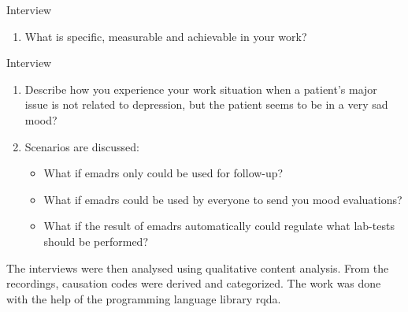 \documentclass[12pt,a4paper,oneside]{article}
\let\oldcite\cite
\renewcommand*\cite[1]{\textsuperscript{\oldcite{#1}}}
\begin{document}
Interview {}\vspace{-.33em}
\begin{enumerate}[label=\sc 1.\arabic*.]
\item {\bf} What is specific, measurable and achievable in your work?
\end{enumerate}
Interview {}\vspace{-.33em}
\begin{enumerate}[label=\sc 2.\arabic*.]
\item {\bf} Describe how you experience your work situation when a patient's major issue is not related to depression, but the patient seems to be in a very sad mood? \vspace{-.33em}
\item {\bf} Scenarios are discussed:\vspace{-.33em}
\begin{itemize}\vspace{-.33em}
\item {\bf} What if e{\sc madrs} only could be used for follow-up?\vspace{-.33em}
\item {\bf} What if e{\sc madrs} could be used by everyone to send you mood evaluations?\vspace{-.33em}
\item {\bf} What if the result of e{\sc madrs} automatically could regulate what lab-tests should be performed?
\end{itemize}
\end{enumerate}
The interviews were then analysed using qualitative content analysis\cite{analysis1}. From the recordings, causation codes were derived and categorized. The work was done with the help of the programming language library {\sc rqda}\cite{rqda}.
\end{document}
